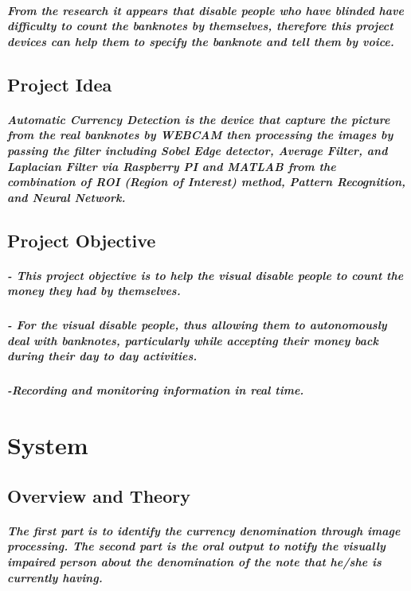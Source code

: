 \documentclass[a4paper,12pt]{report}
\begin{document}
\paragraph{From the research it appears that disable people who have blinded have difficulty to count the banknotes by themselves, therefore this project devices can help them to specify the banknote and tell them by voice.}
\section{Project Idea}
\paragraph{Automatic Currency Detection is the device that capture the picture from the real banknotes by WEBCAM then processing the images by passing the filter including Sobel Edge detector, Average Filter, and Laplacian Filter via Raspberry PI and MATLAB from the combination of ROI (Region of Interest) method, Pattern Recognition, and Neural Network.}
\section{Project Objective}
\paragraph{- This project objective is to help the visual disable people to count the money they had by themselves.}
\paragraph{- For the visual disable people, thus allowing them to autonomously deal with banknotes, particularly while accepting their money back during their day to day activities.}
\paragraph{-Recording and monitoring information in real time.}
	
\chapter{System}
\section{Overview and Theory}
\paragraph{The first part is to identify the currency denomination through image processing. The second part is the oral output to notify the visually impaired person about the denomination of the note that he/she is currently having.}
\end{document}
